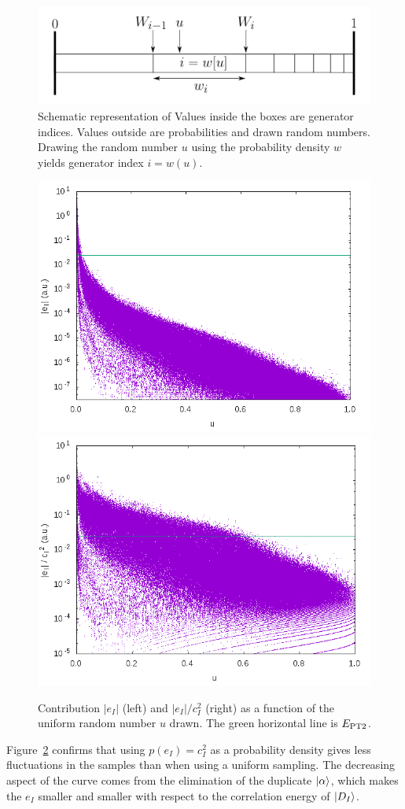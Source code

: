 \documentclass[./thesis.tex]{subfiles}
\begin{document}
\begin{figure}[h!]
	\begin{center}
		\includegraphics[width=0.7\columnwidth]{figures/pt2/mc_representation}
	\end{center}
	\caption{Schematic representation of 
Values inside the boxes are generator indices. Values outside are probabilities and drawn random numbers.
Drawing the random number $u$ using the probability density $w$ yields generator index $i=w(u)$.}
	\label{fig:mc_representation}
\end{figure}

\begin{figure}[h]
	\begin{center}
		\includegraphics[width=0.49\columnwidth]{figures/pt2/eI}
		\includegraphics[width=0.49\columnwidth]{figures/pt2/eici2}
	\end{center}
		\caption{Contribution $|e_I|$ (left) and $|e_I|/c_I^2$ (right) as a function of the uniform random number $u$ drawn. The green horizontal line is $E_\text{PT2}$.}
		\label{fig:ei}
\end{figure}
Figure~\ref{fig:ei} confirms that using $p(e_I) = c_I^2$ as a probability density gives less
fluctuations in the samples than when using a uniform sampling. The decreasing aspect of the curve
comes from the elimination of the duplicate ${\ket{\alpha}}$, which makes the $e_I$ smaller and smaller with respect to
the correlation energy of ${\ket{D_I}}$.
\end{document}
